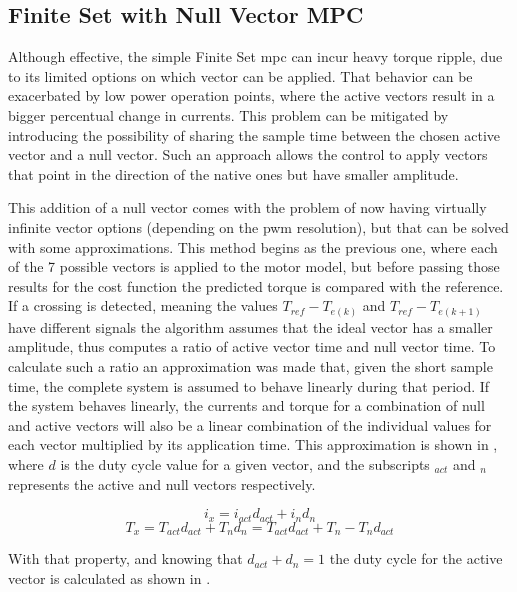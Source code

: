 \subsection{Finite Set with Null Vector MPC}

Although effective, the simple Finite Set \gls{mpc} can incur heavy torque ripple, due to its limited options on which vector can be applied. That behavior can be exacerbated by low power operation points, where the active vectors result in a bigger percentual change in currents. This problem can be mitigated by introducing the possibility of sharing the sample time between the chosen active vector and a null vector. Such an approach allows the control to apply vectors that point in the direction of the native ones but have smaller amplitude.

This addition of a null vector comes with the problem of now having virtually infinite vector options (depending on the \gls{pwm} resolution), but that can be solved with some approximations. This method begins as the previous one, where each of the 7 possible vectors is applied to the motor model, but before passing those results for the cost function the predicted torque is compared with the reference. If a crossing is detected, meaning the values $T_{ref} - T_{e(k)}$ and $T_{ref} - T_{e(k+1)}$ have different signals the algorithm assumes that the ideal vector has a smaller amplitude, thus computes a ratio of active vector time and null vector time. To calculate such a ratio an approximation was made that, given the short sample time, the complete system is assumed to behave linearly during that period. If the system behaves linearly, the currents and torque for a combination of null and active vectors will also be a linear combination of the individual values for each vector multiplied by its application time. This approximation is shown in , where $d$ is the duty cycle value for a given vector, and the subscripts $_{act}$ and $_n$ represents the active and null vectors respectively.

\begin{equation}
	i_x = i_{act} d_{act} + i_n d_n
	\label{eq:linear_combination}
\end{equation}
\begin{equation}
	T_x = T_{act} d_{act} + T_n d_n = T_{act} d_{act} + T_n - T_n d_{act}
	\label{eq:linear_combination_torque}
\end{equation}

With that property, and knowing that $d_{act} + d_n = 1$ the duty cycle for the active vector is calculated as shown in .


